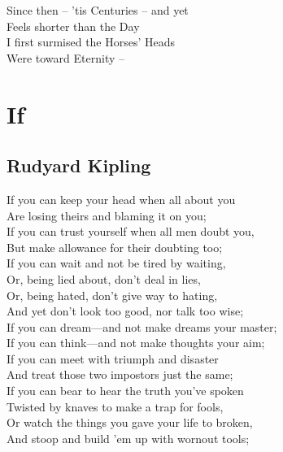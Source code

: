 \documentclass[a4,12pt]{article}
\begin{document}
\begin{center}
        \vspace{15pt}
        Since then – 'tis Centuries – and yet\\
        Feels shorter than the Day\\
        I first surmised the Horses' Heads\\
        Were toward Eternity –\\


        \newpage
        \section*{If}
        \label{sec:If}
        \subsection*{Rudyard Kipling}

        \vspace{15pt}
        If you can keep your head when all about you\\
        Are losing theirs and blaming it on you;\\
        If you can trust yourself when all men doubt you,\\
        But make allowance for their doubting too;\\
        If you can wait and not be tired by waiting,\\
        Or, being lied about, don’t deal in lies,\\
        Or, being hated, don’t give way to hating,\\
        And yet don’t look too good, nor talk too wise;\\

        \vspace{15pt}
        If you can dream—and not make dreams your master;\\
        If you can think—and not make thoughts your aim;\\
        If you can meet with triumph and disaster\\
        And treat those two impostors just the same;\\
        If you can bear to hear the truth you’ve spoken\\
        Twisted by knaves to make a trap for fools,\\
        Or watch the things you gave your life to broken,\\
        And stoop and build ’em up with wornout tools;\\


\end{center}
\end{document}
